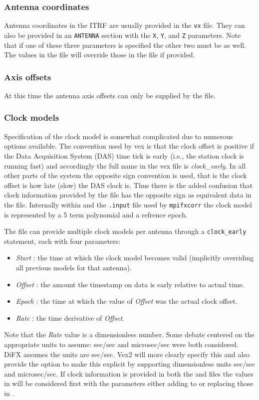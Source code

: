 \documentclass[12pt]{article}
\begin{document}
\subsubsection{Antenna coordinates}

Antenna coordinates in the ITRF are usually provided in the {\tt vx} file.
They can also be provided in an {\tt ANTENNA} section with the {\tt X}, {\tt Y}, and {\tt Z} parameters.
Note that if one of these three parameters is specified the other two must be as well.
The values in the \vd file will override those in the \vx file if provided.


\subsubsection{Axis offsets}

At this time the antenna axis offsets can only be supplied by the \vx file.

\subsubsection{Clock models}

Specification of the clock model is somewhat complicated due to numerous options available.
The convention used by vex is that the clock offset is positive if the Data Acquisition System (DAS) time tick is early (i.e., the station clock is running fast) and accordingly the full name in the vex file is {\em clock\_early}.
In all other parts of the system the opposite sign convention is used, that is the clock offset is how late (slow) the DAS clock is.
Thus there is the added confusion that clock information provided by the \vd file has the opposite sign as equivalent data in the \vx file.
Internally within \vexdifx and the {\tt .input} file used by {\tt mpifxcorr} the clock model is represented by a 5 term polynomial and a refrence epoch.

The \vx file can provide multiple clock models per antenna through a {\tt clock\_early} statement, each with four parameters:
\begin{itemize}
\item {\em Start} : the time at which the clock model becomes valid (implicitly overriding all previous models for that antenna).
\item {\em Offset} : the amount the timestamp on data is early relative to actual time.
\item {\em Epoch} : the time at which the value of {\em Offset} was the actual clock offset.
\item {\em Rate} : the time derivative of {\em Offset}.
\end{itemize}
Note that the {\em Rate} value is a dimensionless number.
Some debate centered on the appropriate units to assume: sec/sec and microsec/sec were both considered.
DiFX assumes the units are sec/sec.
Vex2 will more clearly specify this and also provide the option to make this explicit by supporting dimensionless units sec/sec and microsec/sec.
If clock information is provided in both the \vx and \vd files the values in \vx will be considered first with the \vd parameters either adding to or replacing those in \vx.
\end{document}
